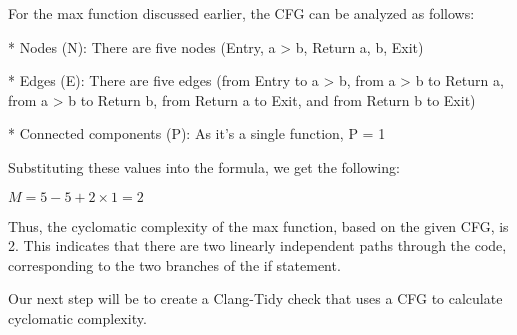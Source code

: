 For the max function discussed earlier, the CFG can be analyzed as follows:

\begin{markdown}
* Nodes (N): There are five nodes (Entry, a > b, Return a, b, Exit)

* Edges (E): There are five edges (from Entry to a > b, from a > b to Return a, from a > b to Return b, from Return a to Exit, and from Return b to Exit)

* Connected components (P): As it's a single function, P = 1
\end{markdown}

Substituting these values into the formula, we get the following:

$ M = 5 − 5 + 2 × 1 = 2$

Thus, the cyclomatic complexity of the max function, based on the given CFG, is 2. This indicates that there are two linearly independent paths through the code, corresponding to the two branches of the if statement.

Our next step will be to create a Clang-Tidy check that uses a CFG to calculate cyclomatic complexity.





































